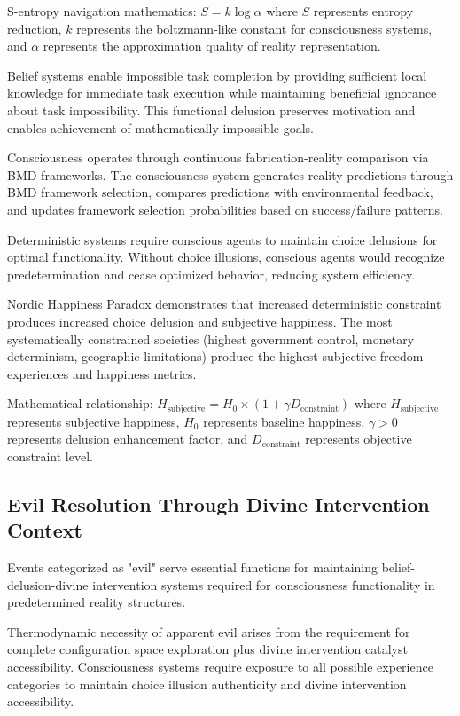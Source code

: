 \documentclass[12pt,a4paper]{article}
\begin{document}
S-entropy navigation mathematics: $S = k \log \alpha$ where $S$ represents entropy reduction, $k$ represents the boltzmann-like constant for consciousness systems, and $\alpha$ represents the approximation quality of reality representation.

Belief systems enable impossible task completion by providing sufficient local knowledge for immediate task execution while maintaining beneficial ignorance about task impossibility. This functional delusion preserves motivation and enables achievement of mathematically impossible goals.

Consciousness operates through continuous fabrication-reality comparison via BMD frameworks. The consciousness system generates reality predictions through BMD framework selection, compares predictions with environmental feedback, and updates framework selection probabilities based on success/failure patterns.

Deterministic systems require conscious agents to maintain choice delusions for optimal functionality. Without choice illusions, conscious agents would recognize predetermination and cease optimized behavior, reducing system efficiency.

Nordic Happiness Paradox demonstrates that increased deterministic constraint produces increased choice delusion and subjective happiness. The most systematically constrained societies (highest government control, monetary determinism, geographic limitations) produce the highest subjective freedom experiences and happiness metrics.

Mathematical relationship: $H_{\text{subjective}} = H_0 \times (1 + \gamma D_{\text{constraint}})$ where $H_{\text{subjective}}$ represents subjective happiness, $H_0$ represents baseline happiness, $\gamma > 0$ represents delusion enhancement factor, and $D_{\text{constraint}}$ represents objective constraint level.

\subsection{Evil Resolution Through Divine Intervention Context}

Events categorized as "evil" serve essential functions for maintaining belief-delusion-divine intervention systems required for consciousness functionality in predetermined reality structures.

Thermodynamic necessity of apparent evil arises from the requirement for complete configuration space exploration plus divine intervention catalyst accessibility. Consciousness systems require exposure to all possible experience categories to maintain choice illusion authenticity and divine intervention accessibility.
\end{document}
